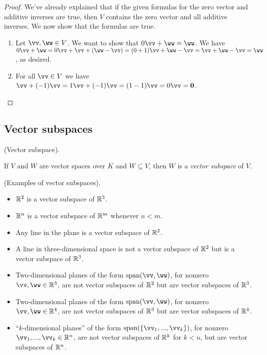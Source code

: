 \begin{proof}
    We've already explained that if the given formulas for the zero vector and additive inverses are true, then $V$ contains the zero vector and all additive inverses. We now show that the formulas are true.

    \begin{enumerate}
        \item Let $\vv, \ww \in V$. We want to show that $0\vv + \ww = \ww$. We have $0\vv + \ww = 0\vv + \vv + (\ww - \vv) = (0 + 1)\vv + \ww - \vv = \vv + \ww - \vv = \ww$, as desired.
        \item For all $\vv \in V$ we have $\vv + (-1)\vv = 1\vv + (-1)\vv = (1 - 1)\vv = 0\vv = \mathbf{0}$.
    \end{enumerate}
\end{proof}

\subsection*{Vector subspaces}

\begin{defn}
\label{ch::lin_alg::defn::vector_subspace}
    (Vector subspace). 
    
    If $V$ and $W$ are vector spaces over $K$ and $W \subseteq V$, then $W$ is a \textit{vector subspace} of $V$.
\end{defn}

\begin{remark}
    (Examples of vector subspaces).
    
    \begin{itemize}
        \item $\mathbb{R}^2$ is a vector subspace of $\mathbb{R}^3$.
        \item $\mathbb{R}^n$ is a vector subspace of $\mathbb{R}^m$ whenever $n < m$.
        \item Any line in the plane is a vector subspace of $\mathbb{R}^2$.
        \item A line in three-dimensional space is not a vector subspace of $\mathbb{R}^2$ but is a vector subspace of $\mathbb{R}^3$.
        \item Two-dimensional planes of the form $\spann(\vv, \ww)$, for nonzero $\vv, \ww \in \R^3$, are not vector subspaces of $\mathbb{R}^2$ but are vector subspaces of $\mathbb{R}^3$.
        \item Two-dimensional planes of the form $\spann(\vv, \ww)$, for nonzero $\vv, \ww \in \R^4$, are not vector subspaces of $\mathbb{R}^3$ but are vector subspaces of $\mathbb{R}^4$.
        \item ``$k$-dimensional planes'' of the form $\spann(\{\vv_1, ..., \vv_k\})$, for nonzero $\vv_1, ..., \vv_k \in \R^n$, are not vector subspaces of $\mathbb{R}^k$ for $k < n$, but are vector subspaces of $\mathbb{R}^n$.
    \end{itemize}
\end{remark}


